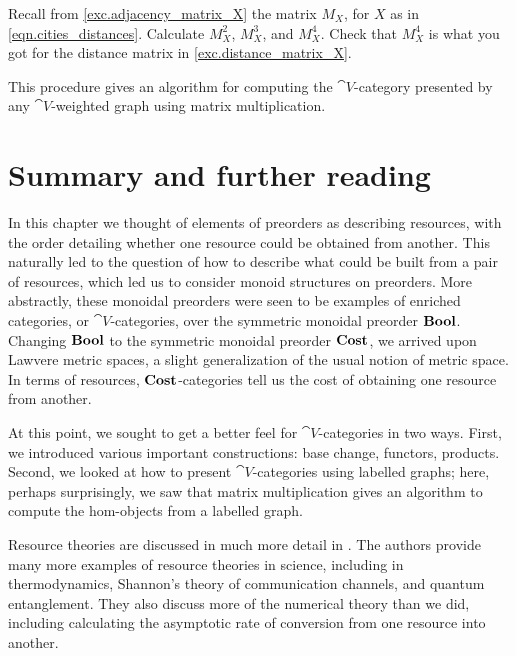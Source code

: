\documentclass[7Sketches]{subfiles}
\begin{document}
\begin{exercise} %
\label{exc.computing_distances}
Recall from \cref{exc.adjacency_matrix_X} the matrix $M_X$, for $X$ as in
\cref{eqn.cities_distances}. Calculate $M_X^2$, $M_X^3$, and $M_X^4$.  Check
that $M_X^4$ is what you got for the distance matrix in
\cref{exc.distance_matrix_X}.
\end{exercise}

This procedure gives an algorithm for computing the $\cat{V}$-category presented
by any $\cat{V}$-weighted graph using matrix multiplication.

%
\section{Summary and further reading}%
\label{sec.resource_theory_further_reading}

In this chapter we thought of elements of preorders as describing resources, with the
order detailing whether one resource could be obtained from another. This
naturally led to the question of how to describe what could be built from a pair
of resources, which led us to consider monoid structures on preorders. More
abstractly, these monoidal preorders were seen to be examples of enriched
categories, or $\cat{V}$-categories, over the symmetric monoidal preorder $\mathbf{Bool}$.
Changing $\mathbf{Bool}$ to the symmetric monoidal preorder $\mathbf{Cost}$, we arrived upon
Lawvere metric spaces, a slight generalization of the usual notion of metric
space. In terms of resources, $\mathbf{Cost}$-categories tell us the cost of obtaining
one resource from another.

At this point, we sought to get a better feel for $\cat{V}$-categories in two
ways. First, we introduced various important constructions: base change, functors,
products. Second, we looked at how to present $\cat{V}$-categories using
labelled graphs; here, perhaps surprisingly, we saw that matrix multiplication
gives an algorithm to compute the hom-objects from a labelled graph.

Resource theories are discussed in much more detail in
\cite{Coecke.Fritz.Spekkens:2016a,Fritz:2017a}. The authors provide many more examples
of resource theories in science, including in thermodynamics, Shannon's theory
of communication channels, and quantum entanglement. They also discuss more of
the numerical theory than we did, including calculating the asymptotic rate of
conversion from one resource into another.
\end{document}
